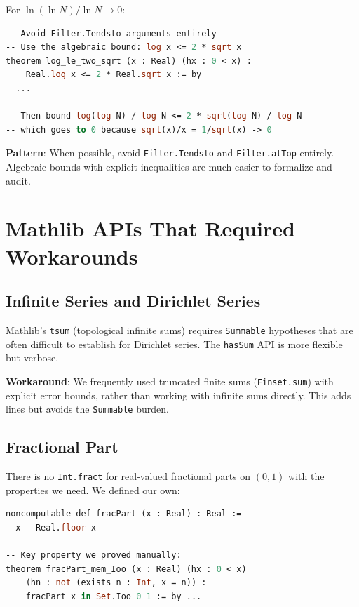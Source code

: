 \documentclass[11pt,a4paper]{article}
\newcommand{\lean}[1]{\texttt{#1}}
\begin{document}
For $\ln(\ln N) / \ln N \to 0$:

\begin{lstlisting}[language=ML,caption={Algebraic limit proof}]
-- Avoid Filter.Tendsto arguments entirely
-- Use the algebraic bound: log x <= 2 * sqrt x
theorem log_le_two_sqrt (x : Real) (hx : 0 < x) :
    Real.log x <= 2 * Real.sqrt x := by
  ...

-- Then bound log(log N) / log N <= 2 * sqrt(log N) / log N
-- which goes to 0 because sqrt(x)/x = 1/sqrt(x) -> 0
\end{lstlisting}

\textbf{Pattern}: When possible, avoid \lean{Filter.Tendsto} and
\lean{Filter.atTop} entirely. Algebraic bounds with explicit
inequalities are much easier to formalize and audit.

\section{Mathlib APIs That Required Workarounds}
\label{sec:workarounds}

\subsection{Infinite Series and Dirichlet Series}

Mathlib's \lean{tsum} (topological infinite sums) requires
\lean{Summable} hypotheses that are often difficult to establish
for Dirichlet series. The \lean{hasSum} API is more flexible but
verbose.

\textbf{Workaround}: We frequently used truncated finite sums
(\lean{Finset.sum}) with explicit error bounds, rather than
working with infinite sums directly. This adds lines but avoids
the \lean{Summable} burden.

\subsection{Fractional Part}

There is no \lean{Int.fract} for real-valued fractional parts on
$(0,1)$ with the properties we need. We defined our own:

\begin{lstlisting}[language=ML,caption={Fractional part definition}]
noncomputable def fracPart (x : Real) : Real :=
  x - Real.floor x

-- Key property we proved manually:
theorem fracPart_mem_Ioo (x : Real) (hx : 0 < x)
    (hn : not (exists n : Int, x = n)) :
    fracPart x in Set.Ioo 0 1 := by ...
\end{lstlisting}
\end{document}
